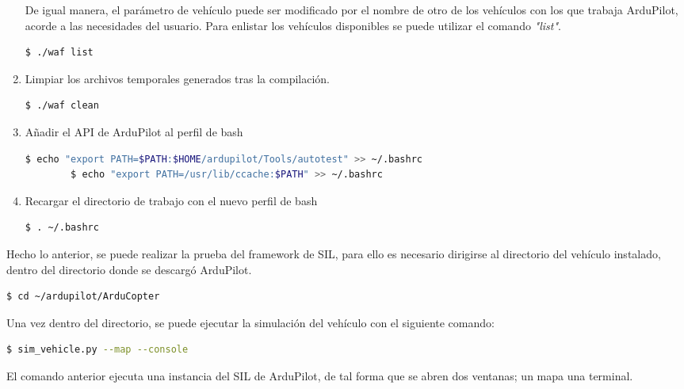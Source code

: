 \begin{enumerate}
    De igual manera, el parámetro de vehículo puede ser modificado por el nombre de otro de los vehículos con los que trabaja ArduPilot, acorde a las necesidades del usuario. Para enlistar los vehículos disponibles se puede utilizar el comando \textit{"list"}.
    
    \begin{lstlisting}[language = bash]
        $ ./waf list
    \end{lstlisting}

    \item Limpiar los archivos temporales generados tras la compilación.
    
    \begin{lstlisting}[language = bash]
        $ ./waf clean
    \end{lstlisting}

    \item Añadir el API de ArduPilot al perfil de bash
    
    \begin{lstlisting}[language = bash]
        $ echo "export PATH=$PATH:$HOME/ardupilot/Tools/autotest" >> ~/.bashrc
        $ echo "export PATH=/usr/lib/ccache:$PATH" >> ~/.bashrc 
    \end{lstlisting}  

    \item Recargar el directorio de trabajo con el nuevo perfil de bash
    
    \begin{lstlisting}[language = bash]
        $ . ~/.bashrc
    \end{lstlisting}  

\end{enumerate}

Hecho lo anterior, se puede realizar la prueba del  framework de SIL, para ello es necesario dirigirse al directorio del vehículo instalado, dentro del directorio donde se descargó ArduPilot. 

\begin{lstlisting}[language = bash]
    $ cd ~/ardupilot/ArduCopter
\end{lstlisting}  

Una vez dentro del directorio, se puede ejecutar la simulación del vehículo con el siguiente comando:

\begin{lstlisting}[language = bash]
    $ sim_vehicle.py --map --console
\end{lstlisting}  


El comando anterior ejecuta una instancia del SIL de ArduPilot, de tal forma que se abren dos ventanas; un mapa una terminal.

